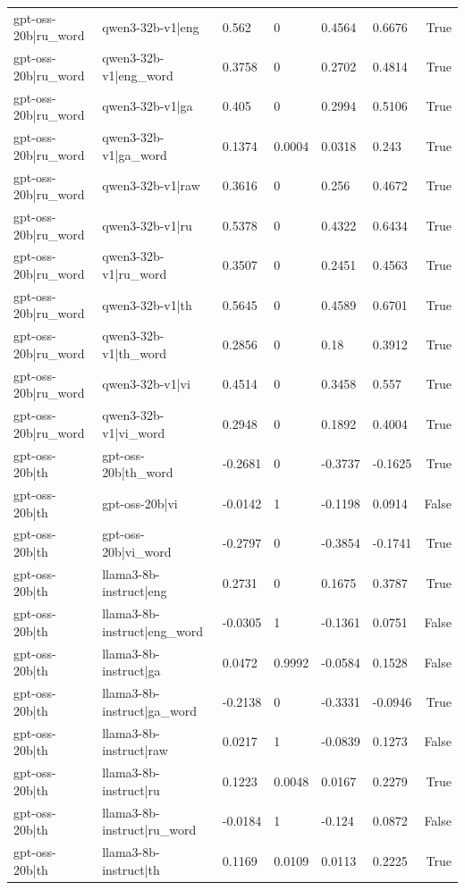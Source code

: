 \begin{table}
\begin{tabular}{llllllr}
gpt-oss-20b|ru_word & qwen3-32b-v1|eng & 0.562 & 0 & 0.4564 & 0.6676 & True \\
gpt-oss-20b|ru_word & qwen3-32b-v1|eng_word & 0.3758 & 0 & 0.2702 & 0.4814 & True \\
gpt-oss-20b|ru_word & qwen3-32b-v1|ga & 0.405 & 0 & 0.2994 & 0.5106 & True \\
gpt-oss-20b|ru_word & qwen3-32b-v1|ga_word & 0.1374 & 0.0004 & 0.0318 & 0.243 & True \\
gpt-oss-20b|ru_word & qwen3-32b-v1|raw & 0.3616 & 0 & 0.256 & 0.4672 & True \\
gpt-oss-20b|ru_word & qwen3-32b-v1|ru & 0.5378 & 0 & 0.4322 & 0.6434 & True \\
gpt-oss-20b|ru_word & qwen3-32b-v1|ru_word & 0.3507 & 0 & 0.2451 & 0.4563 & True \\
gpt-oss-20b|ru_word & qwen3-32b-v1|th & 0.5645 & 0 & 0.4589 & 0.6701 & True \\
gpt-oss-20b|ru_word & qwen3-32b-v1|th_word & 0.2856 & 0 & 0.18 & 0.3912 & True \\
gpt-oss-20b|ru_word & qwen3-32b-v1|vi & 0.4514 & 0 & 0.3458 & 0.557 & True \\
gpt-oss-20b|ru_word & qwen3-32b-v1|vi_word & 0.2948 & 0 & 0.1892 & 0.4004 & True \\
gpt-oss-20b|th & gpt-oss-20b|th_word & -0.2681 & 0 & -0.3737 & -0.1625 & True \\
gpt-oss-20b|th & gpt-oss-20b|vi & -0.0142 & 1 & -0.1198 & 0.0914 & False \\
gpt-oss-20b|th & gpt-oss-20b|vi_word & -0.2797 & 0 & -0.3854 & -0.1741 & True \\
gpt-oss-20b|th & llama3-8b-instruct|eng & 0.2731 & 0 & 0.1675 & 0.3787 & True \\
gpt-oss-20b|th & llama3-8b-instruct|eng_word & -0.0305 & 1 & -0.1361 & 0.0751 & False \\
gpt-oss-20b|th & llama3-8b-instruct|ga & 0.0472 & 0.9992 & -0.0584 & 0.1528 & False \\
gpt-oss-20b|th & llama3-8b-instruct|ga_word & -0.2138 & 0 & -0.3331 & -0.0946 & True \\
gpt-oss-20b|th & llama3-8b-instruct|raw & 0.0217 & 1 & -0.0839 & 0.1273 & False \\
gpt-oss-20b|th & llama3-8b-instruct|ru & 0.1223 & 0.0048 & 0.0167 & 0.2279 & True \\
gpt-oss-20b|th & llama3-8b-instruct|ru_word & -0.0184 & 1 & -0.124 & 0.0872 & False \\
gpt-oss-20b|th & llama3-8b-instruct|th & 0.1169 & 0.0109 & 0.0113 & 0.2225 & True \\

\end{tabular}
\end{table}
